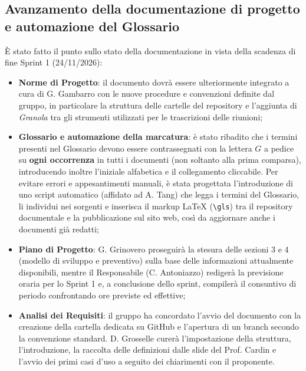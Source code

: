\subsection{Avanzamento della documentazione di progetto e automazione del Glossario}
È stato fatto il punto sullo stato della documentazione in vista della scadenza di fine Sprint 1 (24/11/2026):
\begin{itemize}
    \item \textbf{Norme di Progetto}: il documento dovrà essere ulteriormente integrato a cura di G. Gambarro con le nuove procedure e convenzioni definite dal gruppo, in particolare la struttura delle cartelle del repository e l'aggiunta di \emph{Granola} tra gli strumenti utilizzati per le trascrizioni delle riunioni;
    \item \textbf{Glossario e automazione della marcatura}: è stato ribadito che i termini presenti nel Glossario devono essere contrassegnati con la lettera $G$ a pedice su \textbf{ogni occorrenza} in tutti i documenti (non soltanto alla prima comparsa), introducendo inoltre l'iniziale alfabetica e il collegamento cliccabile. Per evitare errori e appesantimenti manuali, è stata progettata l'introduzione di uno script automatico (affidato ad A. Tang) che legga i termini del Glossario, li individui nei sorgenti e inserisca il markup LaTeX (\texttt{\textbackslash gls}) tra il repository documentale e la pubblicazione sul sito web, così da aggiornare anche i documenti già redatti;
    \item \textbf{Piano di Progetto}: G. Grinovero proseguirà la stesura delle sezioni 3 e 4 (modello di sviluppo e preventivo) sulla base delle informazioni attualmente disponibili, mentre il Responsabile (C. Antoniazzo) redigerà la previsione oraria per lo Sprint 1 e, a conclusione dello sprint, compilerà il consuntivo di periodo confrontando ore previste ed effettive;
    \item \textbf{Analisi dei Requisiti}: il gruppo ha concordato l'avvio del documento con la creazione della cartella dedicata su GitHub e l'apertura di un branch secondo la convenzione standard. D. Grosselle curerà l'impostazione della struttura, l'introduzione, la raccolta delle definizioni dalle slide del Prof. Cardin e l'avvio dei primi casi d'uso a seguito dei chiarimenti con il proponente.
\end{itemize}

